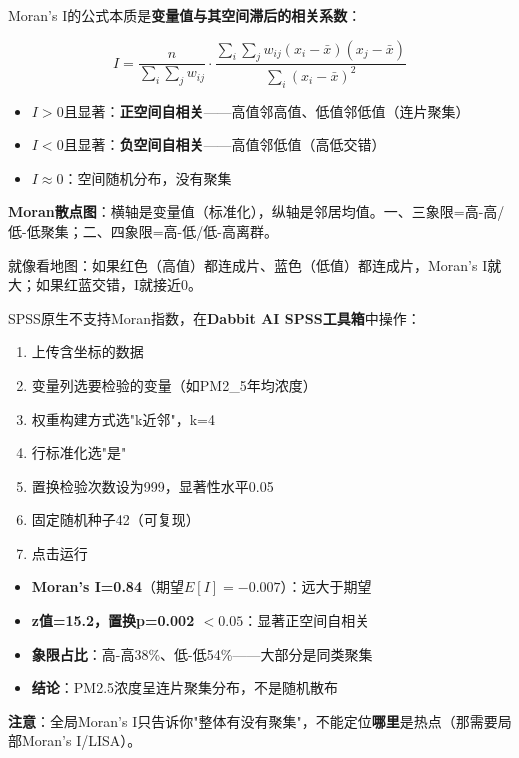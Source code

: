 \begin{algoprinciple}
Moran's I的公式本质是\textbf{变量值与其空间滞后的相关系数}：

\[ I = \frac{n}{\sum_i\sum_j w_{ij}} \cdot \frac{\sum_i\sum_j w_{ij}(x_i-\bar{x})(x_j-\bar{x})}{\sum_i(x_i-\bar{x})^2} \]

\begin{itemize}
    \item $I>0$且显著：\textbf{正空间自相关}——高值邻高值、低值邻低值（连片聚集）
    \item $I<0$且显著：\textbf{负空间自相关}——高值邻低值（高低交错）
    \item $I\approx 0$：空间随机分布，没有聚集
\end{itemize}

\textbf{Moran散点图}：横轴是变量值（标准化），纵轴是邻居均值。一、三象限=高-高/低-低聚集；二、四象限=高-低/低-高离群。

就像看地图：如果红色（高值）都连成片、蓝色（低值）都连成片，Moran's I就大；如果红蓝交错，I就接近0。
\end{algoprinciple}

\begin{algosposs}
SPSS原生不支持Moran指数，在\textbf{Dabbit AI SPSS工具箱}中操作：

\begin{enumerate}
    \item 上传含坐标的数据
    \item 变量列选要检验的变量（如PM2\_5年均浓度）
    \item 权重构建方式选"k近邻"，k=4
    \item 行标准化选"是"
    \item 置换检验次数设为999，显著性水平0.05
    \item 固定随机种子42（可复现）
    \item 点击运行
\end{enumerate}
\end{algosposs}

\begin{algoresult}
\begin{itemize}
    \item \textbf{Moran's I=0.84}（期望$E[I]=-0.007$）：远大于期望
    \item \textbf{z值=15.2，置换p=0.002 $<0.05$}：显著正空间自相关
    \item \textbf{象限占比}：高-高38\%、低-低54\%——大部分是同类聚集
    \item \textbf{结论}：PM2.5浓度呈连片聚集分布，不是随机散布
\end{itemize}

\textbf{注意}：全局Moran's I只告诉你"整体有没有聚集"，不能定位\textbf{哪里}是热点（那需要局部Moran's I/LISA）。
\end{algoresult}

